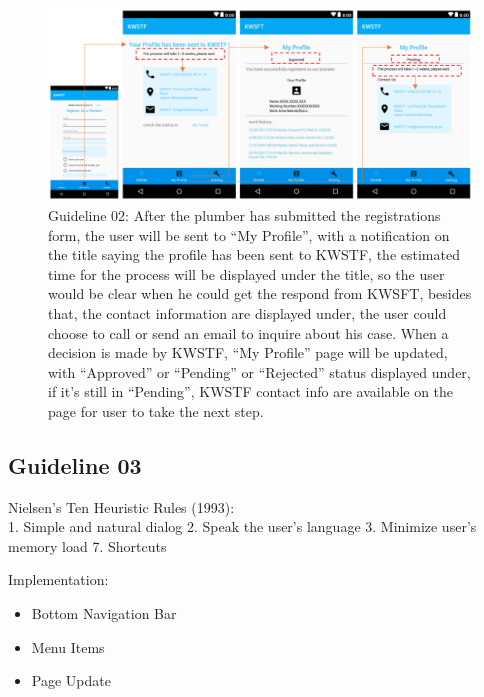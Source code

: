 \documentclass{article}
\begin{document}
\begin{figure}[H]
\centering
\includegraphics[width=15cm]{files/figures/fig2_guide2.png}
\caption{Guideline 02: After the plumber has submitted the registrations form, the user will be sent to “My Profile”, with a notification on the title saying
the profile has been sent to KWSTF, the estimated time for the process will be displayed under the title, so the user would be clear
when he could get the respond from KWSFT, besides that, the contact information are displayed under, the user could choose to
call or send an email to inquire about his case.
When a decision is made by KWSTF, “My Profile” page will be updated, with “Approved” or “Pending” or “Rejected” status
displayed under, if it’s still in “Pending”, KWSTF contact info are available on the page for user to take the next step.
}
\end{figure}

\subsection{Guideline 03}
Nielsen’s Ten Heuristic Rules (1993):\\
1. Simple and natural dialog 2. Speak the user’s language 3. Minimize user’s memory load 7. Shortcuts

\noindent
Implementation:
\begin{itemize}
\item Bottom Navigation Bar
\item Menu Items
\item Page Update
\end{itemize}
\end{document}
